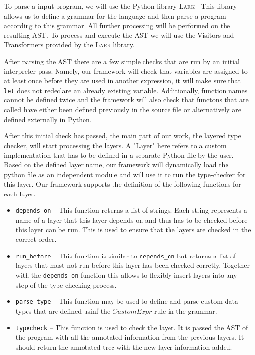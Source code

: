 \documentclass[acmsmall, review, screen]{acmart}
\newcommand{\Lark}[0]{\textsc{Lark}}
\begin{document}
To parse a input program, we will use the Python library \Lark{} \cite{Lark}. This library allows us to define a grammar for the language and then parse a program according to this grammar. All further processing will be performed on the resulting AST. To process and execute the AST we will use the Visitors and Transformers provided by the \Lark{} library.

After parsing the AST there are a few simple checks that are run by an initial interpreter pass. Namely, our framework will check that variables are assigned to at least once before they are used in another expression, it will make sure that \texttt{let} does not redeclare an already existing variable. Additionally, function names cannot be defined twice and the framework will also check that functons that are called have either been defined previously in the source file or alternatively are defined externally in Python.

After this initial check has passed, the main part of our work, the layered type checker, will start processing the layers. A "Layer" here refers to a custom implementation that has to be defined in a separate Python file by the user. Based on the defined layer name, our framework will dynamically load the python file as an independent module and will use it to run the type-checker for this layer. Our framework supports the definition of the following functions for each layer:

\begin{itemize}
	\item \texttt{depends\_on} -- This function returns a list of strings. Each string represents a name of a layer that this layer depends on and thus has to be checked before this layer can be run. This is used to ensure that the layers are checked in the correct order.
	\item \texttt{run\_before} -- This function is similar to \texttt{depends\_on} but returns a list of layers that must not run before this layer has been checked corretly. Together with the \texttt{depends\_on} function this allows to flexibly insert layers into any step of the type-checking process.
	\item \texttt{parse\_type} -- This function may be used to define and parse custom data types that are defined usinf the $CustomExpr$ rule in the grammar. 
	\item \texttt{typecheck} -- This function is used to check the layer. It is passed the AST of the program with all the annotated information from the previous layers. It should return the annotated tree with the new layer information added.
\end{itemize}
\end{document}
